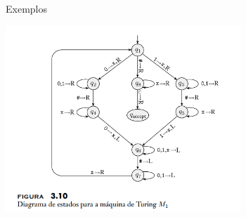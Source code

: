 \documentclass[xcolor=dvipsnames,table]{beamer}
\begin{document}
	\begin{frame}{Exemplos}
		\begin{center}
			\includegraphics[height=7cm]{images/fig310.png}
		\end{center}
	\end{frame}
	
	\begin{frame}
		\titlepage
	\end{frame}
	
\end{document}

